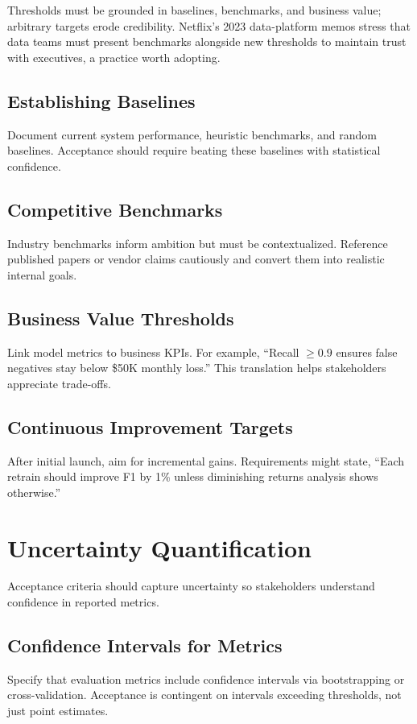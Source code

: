 Thresholds must be grounded in baselines, benchmarks, and business value; arbitrary targets erode credibility. Netflix’s 2023 data-platform memos stress that data teams must present benchmarks alongside new thresholds to maintain trust with executives, a practice worth adopting.

\subsection{Establishing Baselines}
Document current system performance, heuristic benchmarks, and random baselines. Acceptance should require beating these baselines with statistical confidence.

\subsection{Competitive Benchmarks}
Industry benchmarks inform ambition but must be contextualized. Reference published papers or vendor claims cautiously and convert them into realistic internal goals.

\subsection{Business Value Thresholds}
Link model metrics to business KPIs. For example, ``Recall $\ge 0.9$ ensures false negatives stay below \$50K monthly loss.'' This translation helps stakeholders appreciate trade-offs.

\subsection{Continuous Improvement Targets}
After initial launch, aim for incremental gains. Requirements might state, ``Each retrain should improve F1 by 1\% unless diminishing returns analysis shows otherwise.''

\section{Uncertainty Quantification}
\label{sec:uncertainty-quantification}

Acceptance criteria should capture uncertainty so stakeholders understand confidence in reported metrics.

\subsection{Confidence Intervals for Metrics}
Specify that evaluation metrics include confidence intervals via bootstrapping or cross-validation. Acceptance is contingent on intervals exceeding thresholds, not just point estimates.

